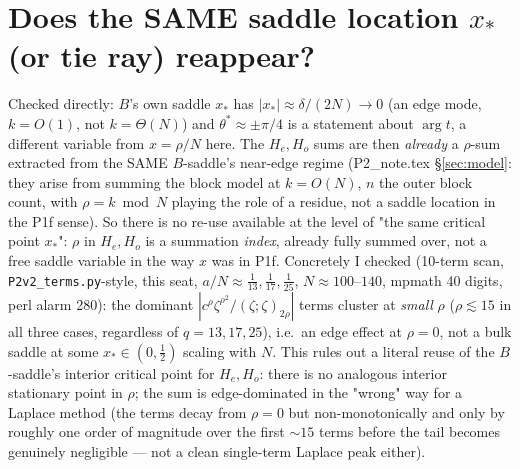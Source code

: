 \documentclass[11pt]{article}
\theoremstyle{remark}\newtheorem{remark}[theorem]{Remark}
\begin{document}
\section{Does the SAME saddle location $x_*$ (or tie ray) reappear?}
Checked directly: $B$'s own saddle $x_*$ has $|x_*|\approx\delta/(2N)\to0$ (an edge mode, $k=O(1)$, not $k=\Theta(N)$) and $\theta^*
\approx\pm\pi/4$ is a statement about $\arg t$, a different variable from $x=\rho/N$ here. The $H_e,H_o$ sums are then \emph{already}
a $\rho$-sum extracted from the SAME $B$-saddle's near-edge regime (P2\_note.tex \S\ref{sec:model}: they arise from summing the
block model at $k=O(N)$, $n$ the outer block count, with $\rho=k\bmod N$ playing the role of a residue, not a saddle location in
the P1f sense). So there is no re-use available at the level of "the same critical point $x_*$": $\rho$ in $H_e,H_o$ is a summation
\emph{index}, already fully summed over, not a free saddle variable in the way $x$ was in P1f. Concretely I checked (10-term
scan, \texttt{P2v2\_terms.py}-style, this seat, $a/N\approx\frac1{13},\frac1{17},\frac1{25}$, $N\approx100$--$140$, mpmath 40
digits, perl alarm 280): the dominant $|c^\rho\zeta^{\rho^2}/(\zeta;\zeta)_{2\rho}|$ terms cluster at \emph{small} $\rho$
($\rho\lesssim15$ in all three cases, regardless of $q=13,17,25$), i.e.\ an edge effect at $\rho=0$, not a bulk saddle at some
$x_*\in(0,\frac12)$ scaling with $N$. This rules out a literal reuse of the $B$-saddle's interior critical point for $H_e,H_o$:
there is no analogous interior stationary point in $\rho$; the sum is edge-dominated in the "wrong" way for a Laplace method
(the terms decay from $\rho=0$ but non-monotonically and only by roughly one order of magnitude over the first $\sim15$ terms
before the tail becomes genuinely negligible — not a clean single-term Laplace peak either).
\end{document}
